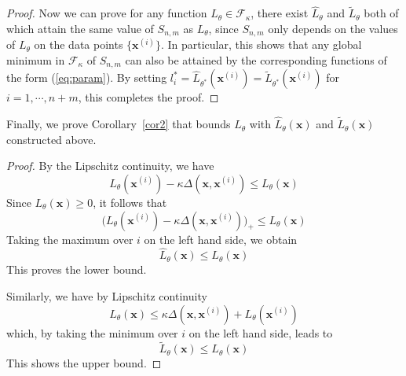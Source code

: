 \documentclass[11pt,fullpage, letterpaper,twoside]{article}
\newcommand{\1}[1]{\mathds{1}_{\left[#1\right]}}
\begin{document}
\begin{proof}
Now we can prove for any function $L_\theta\in \mathcal F_\kappa$, there exist $\widehat L_\theta$ and $\widetilde L_\theta$ both of which attain the same value of $S_{n,m}$ as $L_\theta$, since $S_{n,m}$ only depends on the values of $L_\theta$ on the data points $\{\mathbf x^{(i)}\}$. In particular, this shows that any global minimum in $\mathcal F_\kappa$ of $S_{n,m}$ can also be attained by the corresponding functions of the form (\ref{eq:param}). By setting $l^*_i=\widehat L_{\theta^*}(\mathbf x^{(i)})=\widetilde L_{\theta^*}(\mathbf x^{(i)})$ for $i=1,\cdots,n+m$, this completes the proof.
\end{proof}

Finally, we prove Corollary~\ref{cor2} that bounds $L_\theta$ with $\widehat L_\theta(\mathbf x)$ and $\widetilde L_\theta(\mathbf x)$ constructed above.
\begin{proof}
By the Lipschitz continuity, we have
$$
L_\theta(\mathbf x^{(i)}) -  \kappa\Delta(\mathbf x,\mathbf x^{(i)}) \leq L_\theta(\mathbf x)
$$
Since $L_\theta(\mathbf x)\geq 0$, it follows that
$$
\big(L_\theta(\mathbf x^{(i)}) -  \kappa\Delta(\mathbf x,\mathbf x^{(i)})\big)_+ \leq L_\theta(\mathbf x)
$$
Taking the maximum over $i$ on the left hand side, we obtain
$$
\widehat L_\theta(\mathbf x) \leq L_\theta(\mathbf x)
$$
This proves the lower bound.

Similarly, we have by Lipschitz continuity
$$
L_\theta(\mathbf x) \leq  \kappa\Delta(\mathbf x,\mathbf x^{(i)}) + L_\theta(\mathbf x^{(i)})
$$
which, by taking the minimum over $i$ on the left hand side, leads to
$$
\widetilde L_\theta(\mathbf x) \leq L_\theta(\mathbf x)
$$
This shows the upper bound.
\end{proof}
\end{document}
